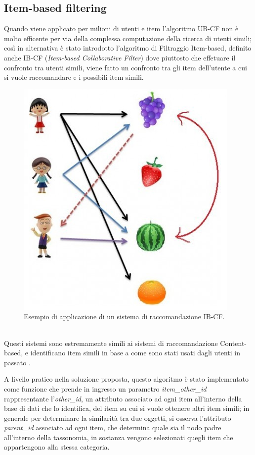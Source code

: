 \newpage

\subsection{Item-based filtering} 
Quando viene applicato per milioni di utenti e item l'algoritmo UB-CF non è molto efficente per via della complessa computazione della 
ricerca di utenti simili; così in alternativa è stato introdotto l'algoritmo di Filtraggio Item-based, definito anche IB-CF 
(\textit{Item-based Collaborative Filter}) dove piuttosto che effetuare il confronto tra utenti simili, viene fatto un confronto tra 
gli item dell'utente a cui si vuole raccomandare e i possibili item simili.

\begin{figure}[ht!]
	\centering
	\includegraphics[scale=0.5]{images/IB_CF_ex.png}
	\caption{Esempio di applicazione di un sistema di raccomandazione IB-CF.}
	\label{fig:IB_CF}
\end{figure}
\ \\
Questi sistemi sono estremamente simili ai sistemi di raccomandazione Content-based, e identificano item simili in base a come sono
stati usati dagli utenti in passato \cite{item-based-collaborative-filtering}.

A livello pratico nella soluzione proposta, questo algoritmo è stato implementato come funzione che prende in ingresso un 
parametro \textit{item\_other\_id} rappresentante l'\textit{other\_id}, un attributo associato ad ogni item all'interno della base di dati
che lo identifica, del item su cui si vuole ottenere altri item simili; in generale per determinare la similarità tra due oggetti, si osserva 
l'attributo \textit{parent\_id} associato ad ogni item, che determina quale sia il nodo padre all'interno della tassonomia, in sostanza 
vengono selezionati quegli item che appartengono alla stessa categoria.\\

